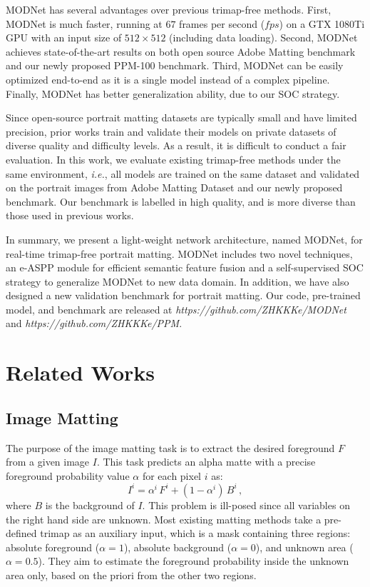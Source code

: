 \documentclass[letterpaper]{article} \usepackage{aaai22}  \usepackage{times}  \usepackage{helvet}  \usepackage{courier}  \usepackage[hyphens]{url}  \usepackage{graphicx} \urlstyle{rm} \def\UrlFont{\rm}  \usepackage{natbib}  \usepackage{caption} \usepackage{booktabs}
\begin{document}
MODNet has several advantages over previous trimap-free methods. 
First, MODNet is much faster, running at $67$ frames per second ($fps$) on a GTX 1080Ti GPU with an input size of $512\times512$ (including data loading). 
Second, MODNet achieves state-of-the-art results on both open source Adobe Matting benchmark and our newly proposed PPM-100 benchmark.
Third, MODNet can be easily optimized end-to-end as it is a single model instead of a complex pipeline. Finally, MODNet has better generalization ability, due to our SOC strategy. 

Since open-source portrait matting datasets \cite{DAPM, DIM} are typically small and have limited precision, prior works train and validate their models on private datasets of diverse quality and difficulty levels. As a result, it is difficult to conduct a fair evaluation. In this work, we evaluate existing trimap-free methods under the same environment, {\it i.e.}, all models are trained on the same dataset and validated on the portrait images from Adobe Matting Dataset \cite{DIM} and our newly proposed benchmark. Our benchmark is labelled in high quality, and is more diverse than those used in previous works.


In summary, we present a light-weight network architecture, named MODNet, for real-time trimap-free portrait matting. MODNet includes two novel techniques, an e-ASPP module for efficient semantic feature fusion and a self-supervised SOC strategy to generalize MODNet to new data domain. In addition, we have also designed a new validation benchmark for portrait matting. Our code, pre-trained model, and benchmark are released at {\it https://github.com/ZHKKKe/MODNet} and {\it https://github.com/ZHKKKe/PPM}.

\section{Related Works}
\subsection{Image Matting}
The purpose of the image matting task is to extract the desired foreground $F$ from a given image $I$. 
This task predicts an alpha matte with a precise foreground probability value $\alpha$ for each pixel $i$ as:
\begin{equation}
I^{i} = \alpha^{i} \, F^{i} + (1 - \alpha^{i}) \, B^{i} \, ,    
\end{equation}
where $B$ is the background of $I$. This problem is ill-posed since all variables on the right hand side are unknown. Most existing matting methods take a pre-defined trimap as an auxiliary input, which is a mask containing three regions: absolute foreground ($\alpha = 1$), absolute background ($\alpha = 0$), and unknown area ($\alpha = 0.5$). They aim to estimate the foreground probability inside the unknown area only, based on the priori from the other two regions.
\end{document}
